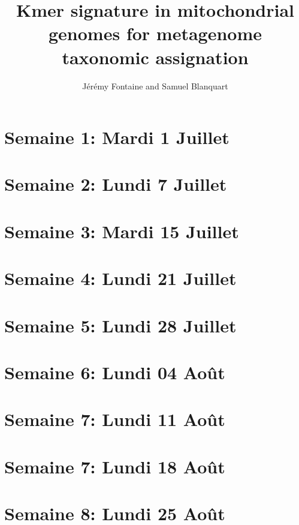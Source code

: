 \documentclass[10pt,a4paper]{article}
\title{Kmer signature in mitochondrial genomes for metagenome taxonomic assignation}
\author{Jérémy Fontaine and Samuel Blanquart}
\begin{document}
\maketitle

\section{Semaine 1: Mardi 1 Juillet}


\newpage
\section{Semaine 2: Lundi 7 Juillet}


\newpage
\section{Semaine 3: Mardi 15 Juillet}


\newpage
\section{Semaine 4: Lundi 21 Juillet}


\newpage
\section{Semaine 5: Lundi 28 Juillet}


\newpage
\section{Semaine 6: Lundi 04 Août}


\newpage
\section{Semaine 7: Lundi 11 Août}


\newpage
\section{Semaine 7: Lundi 18 Août}


\newpage
\section{Semaine 8: Lundi 25 Août}

\end{document}
